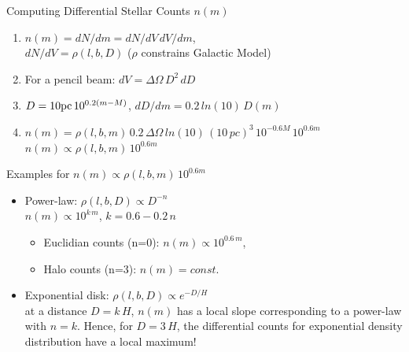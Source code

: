 \documentclass[letterpaper,landscape]{slides}
\begin{document}
\begin{slide}
\begin{center}
{\large \color{red}  Computing Differential Stellar Counts $n(m)$  }
\end{center}

\begin{enumerate}

\item
     $n(m) = dN/dm = dN/dV \, dV/dm$, \\ $dN/dV = \rho(l,b,D)$ ($\rho$ constrains Galactic Model)

\item
For a pencil beam: $dV = \Delta \Omega \, D^2 \, dD$

\item
      $D = 10 {\rm pc} \, 10^{0.2(m-M)}$, $dD/dm = 0.2\,ln(10)\, D(m)$

\item
 $n(m) = \rho(l,b,m)\, 0.2\, \Delta \Omega\,ln(10)\,(10\,pc)^3\,10^{-0.6M}\,10^{0.6m}$ \\

{\color{blue} \Large \hskip 1.5in   $n(m) \propto \rho(l,b,m)\, 10^{0.6m}$}

\end{enumerate}  

\vfill
\end{slide}




\begin{slide}
\begin{center}
{\large \color{red}  Examples for $n(m)\propto \rho(l,b,m)\, 10^{0.6m}$ }
\end{center}

\begin{itemize}
\item
{\color{red} Power-law: $ \rho(l,b,D) \propto D^{-n}$} \\

    {\color{blue} \hskip 1.5in    $  n(m) \propto 10^{k\, m}$, $k= 0.6-0.2\,n$}
        \begin{itemize}
         \item
            Euclidian counts (n=0):  $n(m) \propto 10^{0.6\, m}$,
          \item
            Halo counts (n=3):  $n(m) = const.$
       \end{itemize}  
\item 
{\color{red} Exponential disk:  $\rho(l,b,D) \propto e^{-D/H}$} \\
at a distance $D=k\,H$, $n(m)$ has a local slope corresponding to a power-law 
with $n=k$. Hence, for $D=3\,H$, the differential counts for exponential density
distribution have a local maximum! 
\end{itemize}  

\vfill
\end{slide}
\end{document}
